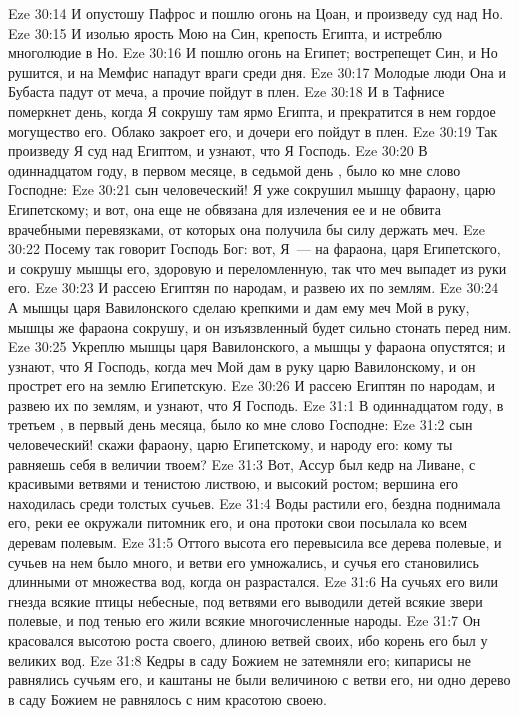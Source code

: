 \vs Eze 30:14 И опустошу Пафрос и пошлю огонь на Цоан, и произведу суд над Но.
\vs Eze 30:15 И изолью ярость Мою на Син, крепость Египта, и истреблю многолюдие в Но.
\vs Eze 30:16 И пошлю огонь на Египет; вострепещет Син, и Но рушится, и на Мемфис нападут враги среди дня.
\vs Eze 30:17 Молодые люди Она и Бубаста падут от меча, а прочие пойдут в плен.
\vs Eze 30:18 И в Тафнисе померкнет день, когда Я сокрушу там ярмо Египта, и прекратится в нем гордое могущество его. Облако закроет его, и дочери его пойдут в плен.
\vs Eze 30:19 Так произведу Я суд над Египтом, и узнают, что Я Господь.
\rsbpar\vs Eze 30:20 В одиннадцатом году, в первом месяце, в седьмой день , было ко мне слово Господне:
\vs Eze 30:21 сын человеческий! Я уже сокрушил мышцу фараону, царю Египетскому; и вот, она еще не обвязана для излечения ее и не обвита врачебными перевязками, от которых она получила бы силу держать меч.
\vs Eze 30:22 Посему так говорит Господь Бог: вот, Я~--- на фараона, царя Египетского, и сокрушу мышцы его, здоровую и переломленную, так что меч выпадет из руки его.
\vs Eze 30:23 И рассею Египтян по народам, и развею их по землям.
\vs Eze 30:24 А мышцы царя Вавилонского сделаю крепкими и дам ему меч Мой в руку, мышцы же фараона сокрушу, и он изъязвленный будет сильно стонать перед ним.
\vs Eze 30:25 Укреплю мышцы царя Вавилонского, а мышцы у фараона опустятся; и узнают, что Я Господь, когда меч Мой дам в руку царю Вавилонскому, и он прострет его на землю Египетскую.
\vs Eze 30:26 И рассею Египтян по народам, и развею их по землям, и узнают, что Я Господь.
\vs Eze 31:1 В одиннадцатом году, в третьем , в первый день месяца, было ко мне слово Господне:
\vs Eze 31:2 сын человеческий! скажи фараону, царю Египетскому, и народу его: кому ты равняешь себя в величии твоем?
\vs Eze 31:3 Вот, Ассур был кедр на Ливане, с красивыми ветвями и тенистою листвою, и высокий ростом; вершина его находилась среди толстых сучьев.
\vs Eze 31:4 Воды растили его, бездна поднимала его, реки ее окружали питомник его, и она протоки свои посылала ко всем деревам полевым.
\vs Eze 31:5 Оттого высота его перевысила все дерева полевые, и сучьев на нем было много, и ветви его умножались, и сучья его становились длинными от множества вод, когда он разрастался.
\vs Eze 31:6 На сучьях его вили гнезда всякие птицы небесные, под ветвями его выводили детей всякие звери полевые, и под тенью его жили всякие многочисленные народы.
\vs Eze 31:7 Он красовался высотою роста своего, длиною ветвей своих, ибо корень его был у великих вод.
\vs Eze 31:8 Кедры в саду Божием не затемняли его; кипарисы не равнялись сучьям его, и каштаны не были величиною с ветви его, ни одно дерево в саду Божием не равнялось с ним красотою своею.
